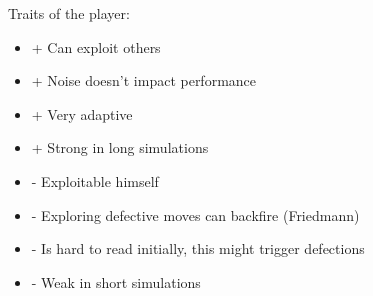 Traits of the player:


\renewcommand{\labelitemi}{}
\begin{itemize}
	\item + Can exploit others
	\item + Noise doesn't impact performance
	\item + Very adaptive
	\item + Strong in long simulations
	\item - Exploitable himself
	\item - Exploring defective moves can backfire (Friedmann)
	\item - Is hard to read initially, this might trigger defections
	\item - Weak in short simulations
\end{itemize}
\renewcommand{\labelitemi}{$\bullet$}

\newpage
